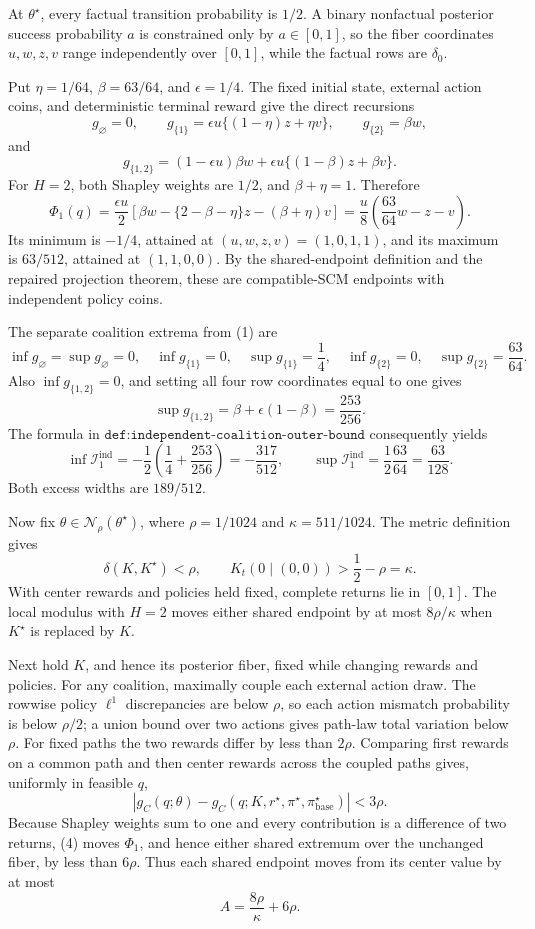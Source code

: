 At \(\theta^\star\), every factual transition probability is \(1/2\).  A binary nonfactual posterior success probability \(a\) is constrained only by \(a\in[0,1]\), so the fiber coordinates \(u,w,z,v\) range independently over \([0,1]\), while the factual rows are \(\delta_0\).

Put \(\eta=1/64\), \(\beta=63/64\), and \(\epsilon=1/4\).  The fixed initial state, external action coins, and deterministic terminal reward give the direct recursions
\[
 g_\varnothing=0,
 \qquad g_{\{1\}}=\epsilon u\{(1-\eta)z+\eta v\},
 \qquad g_{\{2\}}=\beta w,
\]
and
\[
 g_{\{1,2\}}=(1-\epsilon u)\beta w
 +\epsilon u\{(1-\beta)z+\beta v\}. \tag{1}
\]
For \(H=2\), both Shapley weights are \(1/2\), and \(\beta+\eta=1\).  Therefore
\[
 \Phi_1(q)=\frac{\epsilon u}{2}
 \left[\beta w-\{2-\beta-\eta\}z-(\beta+\eta)v\right]
 =\frac{u}{8}\left(\frac{63}{64}w-z-v\right). \tag{2}
\]
Its minimum is \(-1/4\), attained at \((u,w,z,v)=(1,0,1,1)\), and its maximum is \(63/512\), attained at \((1,1,0,0)\).  By the shared-endpoint definition and the repaired projection theorem, these are compatible-SCM endpoints with independent policy coins.

The separate coalition extrema from (1) are
\[
 \inf g_\varnothing=\sup g_\varnothing=0,
 \quad \inf g_{\{1\}}=0,
 \quad \sup g_{\{1\}}=\frac14,
 \quad \inf g_{\{2\}}=0,
 \quad \sup g_{\{2\}}=\frac{63}{64}.
\]
Also \(\inf g_{\{1,2\}}=0\), and setting all four row coordinates equal to one gives
\[
 \sup g_{\{1,2\}}=\beta+\epsilon(1-\beta)=\frac{253}{256}.
\]
The formula in \(\texttt{def:independent-coalition-outer-bound}\) consequently yields
\[
 \inf\mathcal I_1^{\mathrm{ind}}=-\frac12\left(\frac14+\frac{253}{256}\right)
 =-\frac{317}{512},
 \qquad
 \sup\mathcal I_1^{\mathrm{ind}}=\frac12\frac{63}{64}=\frac{63}{128}.
\]
Both excess widths are \(189/512\).

Now fix \(\theta\in\mathcal N_\rho(\theta^\star)\), where \(\rho=1/1024\) and \(\kappa=511/1024\).  The metric definition gives
\[
 \delta(K,K^\star)<\rho,
 \qquad K_t(0\mid(0,0))>\frac12-\rho=\kappa. \tag{3}
\]
With center rewards and policies held fixed, complete returns lie in \([0,1]\).  The local modulus with \(H=2\) moves either shared endpoint by at most \(8\rho/\kappa\) when \(K^\star\) is replaced by \(K\).

Next hold \(K\), and hence its posterior fiber, fixed while changing rewards and policies.  For any coalition, maximally couple each external action draw.  The rowwise policy \(\ell^1\) discrepancies are below \(\rho\), so each action mismatch probability is below \(\rho/2\); a union bound over two actions gives path-law total variation below \(\rho\).  For fixed paths the two rewards differ by less than \(2\rho\).  Comparing first rewards on a common path and then center rewards across the coupled paths gives, uniformly in feasible \(q\),
\[
 |g_C(q;\theta)-g_C(q;K,r^\star,\pi^\star,\pi_{\mathrm{base}}^\star)|<3\rho. \tag{4}
\]
Because Shapley weights sum to one and every contribution is a difference of two returns, (4) moves \(\Phi_1\), and hence either shared extremum over the unchanged fiber, by less than \(6\rho\).  Thus each shared endpoint moves from its center value by at most
\[
 A=\frac{8\rho}{\kappa}+6\rho. \tag{5}
\]

